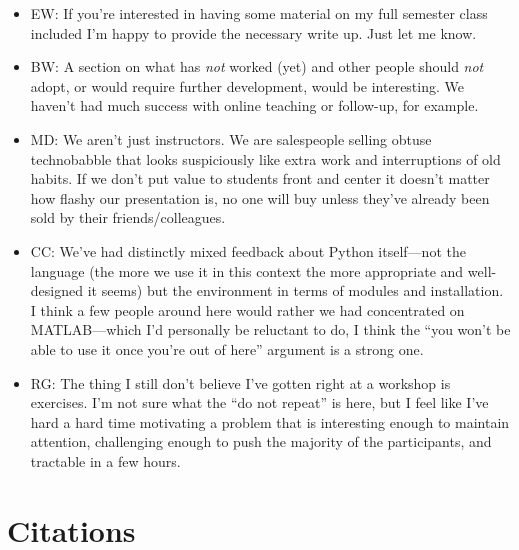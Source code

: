 \documentclass{article}
\begin{document}
\begin{itemize}

  \item EW: If you're interested in having some material on my full
    semester class included I'm happy to provide the necessary write
    up. Just let me know.

  \item BW: A section on what has {\em not} worked (yet) and other people
    should {\em not} adopt, or would require further development, would
    be interesting. We haven't had much success with online teaching or
    follow-up, for example.

  \item MD: We aren't just instructors. We are salespeople selling
    obtuse technobabble that looks suspiciously like extra work and
    interruptions of old habits. If we don't put value to students
    front and center it doesn't matter how flashy our presentation is,
    no one will buy unless they've already been sold by their
    friends/colleagues.

  \item CC: We've had distinctly mixed feedback about Python
    itself---not the language (the more we use it in this context the
    more appropriate and well-designed it seems) but the environment
    in terms of modules and installation. I think a few people around
    here would rather we had concentrated on MATLAB---which I'd
    personally be reluctant to do, I think the ``you won't be able to
    use it once you're out of here'' argument is a strong one.

  \item RG: The thing I still don't believe I've gotten right at a
    workshop is exercises. I'm not sure what the ``do not repeat'' is
    here, but I feel like I've hard a hard time motivating a problem
    that is interesting enough to maintain attention, challenging
    enough to push the majority of the participants, and tractable in
    a few hours.

\end{itemize}

\section{Citations}

\cite{hannay2009} \cite{prabhu2011} \cite{wilson1996}
\cite{wilson2006a} \cite{wilson2006b} \cite{wilson2009}



\end{document}
